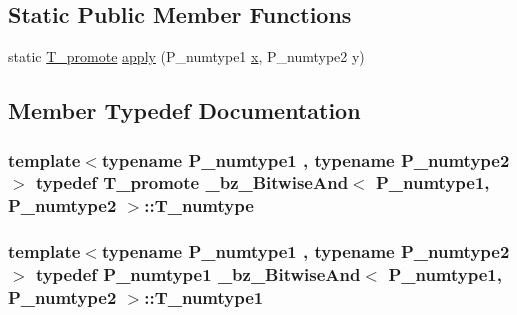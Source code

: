 \subsection*{Static Public Member Functions}
\begin{DoxyCompactItemize}
\item 
static \hyperlink{minmax_8h_aaa88a440c2f0d00798d5b1d42c79308d}{T\+\_\+promote} \hyperlink{class__bz__BitwiseAnd_a58d7b262c61ce8dde5da3b49c3c0aa1a}{apply} (P\+\_\+numtype1 \hyperlink{vecnorm1_8cc_ac73eed9e41ec09d58f112f06c2d6cb63}{x}, P\+\_\+numtype2 y)
\end{DoxyCompactItemize}


\subsection{Member Typedef Documentation}
\hypertarget{class__bz__BitwiseAnd_a392ad6579f509873cdfad1f014dcdc37}{}
\subsubsection[{T\+\_\+numtype}]{\setlength{\rightskip}{0pt plus 5cm}template$<$typename P\+\_\+numtype1 , typename P\+\_\+numtype2 $>$ typedef {\bf T\+\_\+promote} {\bf \+\_\+bz\+\_\+\+Bitwise\+And}$<$ P\+\_\+numtype1, P\+\_\+numtype2 $>$\+::{\bf T\+\_\+numtype}}\label{class__bz__BitwiseAnd_a392ad6579f509873cdfad1f014dcdc37}
\hypertarget{class__bz__BitwiseAnd_ad481864869838cfb4ef822609e8863ba}{}
\subsubsection[{T\+\_\+numtype1}]{\setlength{\rightskip}{0pt plus 5cm}template$<$typename P\+\_\+numtype1 , typename P\+\_\+numtype2 $>$ typedef P\+\_\+numtype1 {\bf \+\_\+bz\+\_\+\+Bitwise\+And}$<$ P\+\_\+numtype1, P\+\_\+numtype2 $>$\+::{\bf T\+\_\+numtype1}}\label{class__bz__BitwiseAnd_ad481864869838cfb4ef822609e8863ba}
\hypertarget{class__bz__BitwiseAnd_ab5a75e5400980ef2ec8f118dbcf4874f}{}
